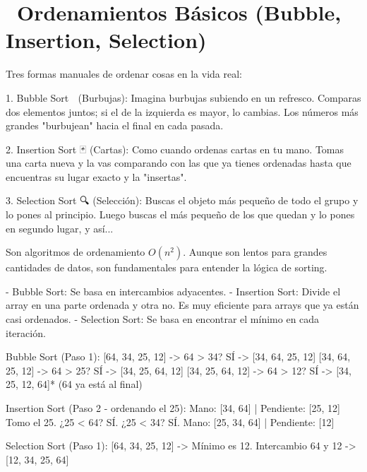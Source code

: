 ﻿\chapter[\emj{🫧}~Ordenamientos Básicos (Bubble, Insertion, Selection)]{~Ordenamientos Básicos (Bubble, Insertion, Selection)}

\begin{dsaquees}

Tres formas manuales de ordenar cosas en la vida real:

1. Bubble Sort 🫧 (Burbujas): Imagina burbujas subiendo en un refresco.
   Comparas dos elementos juntos; si el de la izquierda es mayor, lo
   cambias. Los números más grandes "burbujean" hacia el final en 
   cada pasada.

2. Insertion Sort 🃏 (Cartas): Como cuando ordenas cartas en tu mano.
   Tomas una carta nueva y la vas comparando con las que ya tienes
   ordenadas hasta que encuentras su lugar exacto y la "insertas".

3. Selection Sort 🔍 (Selección): Buscas el objeto más pequeño de 
   todo el grupo y lo pones al principio. Luego buscas el más pequeño
   de los que quedan y lo pones en segundo lugar, y así...

\end{dsaquees}

\begin{dsaotraforma}

Son algoritmos de ordenamiento $O(n^2)$. Aunque son lentos para grandes
cantidades de datos, son fundamentales para entender la lógica de 
sorting.

- Bubble Sort: Se basa en intercambios adyacentes.
- Insertion Sort: Divide el array en una parte ordenada y otra no. 
  Es muy eficiente para arrays que ya están casi ordenados.
- Selection Sort: Se basa en encontrar el mínimo en cada iteración.

\end{dsaotraforma}

\begin{dsadiagrama}
Bubble Sort (Paso 1):
[64, 34, 25, 12] -> 64 > 34? SÍ -> [34, 64, 25, 12]
[34, 64, 25, 12] -> 64 > 25? SÍ -> [34, 25, 64, 12]
[34, 25, 64, 12] -> 64 > 12? SÍ -> [34, 25, 12, 64]* (64 ya está al final)

Insertion Sort (Paso 2 - ordenando el 25):
Mano: [34, 64] | Pendiente: [25, 12]
Tomo el 25. ¿25 < 64? SÍ. ¿25 < 34? SÍ.
Mano: [25, 34, 64] | Pendiente: [12]

Selection Sort (Paso 1):
[64, 34, 25, 12] -> Mínimo es 12.
Intercambio 64 y 12 -> [12, 34, 25, 64]
\end{dsadiagrama}

